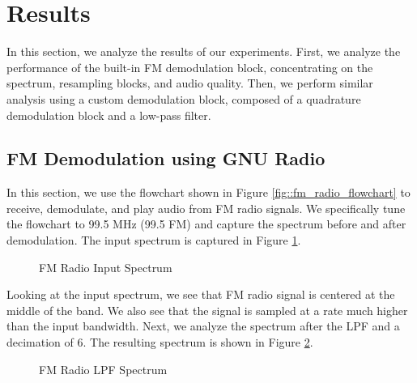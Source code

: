 \documentclass{article}
\begin{document}
\section{Results}

In this section, we analyze the results of our experiments. First, we analyze the performance of the built-in FM demodulation block, concentrating on the spectrum, resampling blocks, and audio quality. Then, we perform similar analysis using a custom demodulation block, composed of a quadrature demodulation block and a low-pass filter.

\subsection{FM Demodulation using GNU Radio}

In this section, we use the flowchart shown in Figure \ref{fig::fm_radio_flowchart} to receive, demodulate, and play audio from FM radio signals. We specifically tune the flowchart to 99.5 MHz (99.5 FM) and capture the spectrum before and after demodulation. The input spectrum is captured in Figure \ref{fig::fm_radio_input_spectrum}.

\begin{figure}[H]
	\centerline{}
	\caption{FM Radio Input Spectrum}
	\label{fig::fm_radio_input_spectrum}
\end{figure}

\noindent Looking at the input spectrum, we see that FM radio signal is centered at the middle of the band. We also see that the signal is sampled at a rate much higher than the input bandwidth. Next, we analyze the spectrum after the LPF and a decimation of 6. The resulting spectrum is shown in Figure \ref{fig::fm_radio_lpf_spectrum}.

\begin{figure}[H]
	\centerline{}
	\caption{FM Radio LPF Spectrum}
	\label{fig::fm_radio_lpf_spectrum}
\end{figure}
\end{document}
